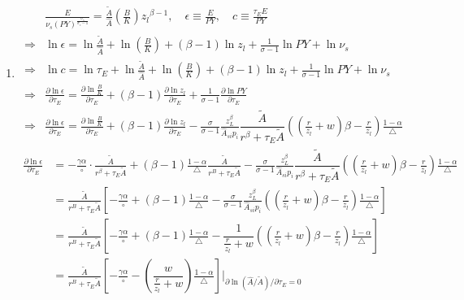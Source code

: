 \documentclass[12pt]{article} %
\begin{document}
\begin{enumerate}
 
    \item 

    \begin{align*}
        & \frac{E}{\nu_{s}(PY)^{\frac{\sigma_s}{\sigma_s - 1}}}  = \frac{\tilde{A}}{\hat{A}}(\frac{B}{K}) {{z_l}}^{\beta-1} , \quad \epsilon \equiv  \frac{E}{PY}, \quad c \equiv \frac{\tau_E E}{PY}\\
        \Rightarrow & \ln \epsilon =  \ln \frac{\tilde{A}}{\hat{A}} + \ln(\frac{B}{K}) + (\beta-1) \ln {{z_l}} + \frac{1}{\sigma -1} \ln PY + \ln \nu_{s} \\
        \Rightarrow & \ln c = \ln \tau_E + \ln \frac{\tilde{A}}{\hat{A}} + \ln(\frac{B}{K}) + (\beta-1) \ln {{z_l}} + \frac{1}{\sigma -1} \ln PY + \ln \nu_{s}
        \\
        \Rightarrow & \frac{\partial \ln \epsilon}{\partial \tau_E} =   \frac{\partial \ln \frac{B}{K} }{\partial \tau_E} 
        + (\beta - 1) \frac{\partial \ln z_l }{\partial \tau_E} + \frac{1}{\sigma -1} \frac{\partial\ln PY }{\partial \tau_E}\\
        \Rightarrow & \frac{\partial \ln \epsilon}{\partial \tau_E} =   \frac{\partial \ln \frac{B}{K} }{\partial \tau_E}
        + (\beta - 1) \frac{\partial \ln z_l }{\partial \tau_E}  - \frac{\sigma}{\sigma -1}\frac{z_L^{\beta}}{\hat{A}_{si}p_i} \dfrac{\tilde{A}}{r^\beta+\tau_E \tilde{A}}
        ((\frac{r}{z_l} + w)\beta-\frac{r}{z_l} )\frac{1-\alpha}{\triangle}
    \end{align*}
    \begin{align*}
        \frac{\partial \ln \epsilon}{\partial \tau_E}  &=   - \frac{\gamma\alpha}{\circ} \cdot \frac{\tilde{A}}{r^\beta+\tau_E \tilde{A}}	
        + (\beta-1) \frac{1-\alpha}{\triangle}\frac{\tilde{A}}{r^B + \tau_E\tilde{A}}
        - \frac{\sigma}{\sigma -1}\frac{z_L^{\beta}}{\hat{A}_{si}p_i} \dfrac{\tilde{A}}{r^\beta+\tau_E \tilde{A}}
        ((\frac{r}{z_l} + w)\beta-\frac{r}{z_l} )\frac{1-\alpha}{\triangle}\\
        &= \frac{\tilde{A}}{r^B + \tau_E\tilde{A}}\left[
            -\frac{\gamma\alpha}{\circ} 
            + (\beta-1) \frac{1-\alpha}{\triangle} 
            - \frac{\sigma}{\sigma -1}\frac{z_L^{\beta}}{{\hat{A}_{si}}p_i} {((\frac{r}{z_l} + w)\beta-\frac{r}{z_l} )}\frac{1-\alpha}{\triangle}
        \right]\\
        &= \frac{\tilde{A}}{r^B + \tau_E\tilde{A}}\left[
            -\frac{\gamma\alpha}{\circ} 
            + (\beta-1) \frac{1-\alpha}{\triangle} 
            - \dfrac{1}{\frac{r}{z_l} + w} {((\frac{r}{z_l} + w)\beta-\frac{r}{z_l} )}\frac{1-\alpha}{\triangle}
        \right]\\
        & = \frac{\tilde{A}}{r^B + \tau_E\tilde{A}}\left[
            -\frac{\gamma\alpha}{\circ} 
            - (\dfrac{w}{\frac{r}{z_l} + w})\frac{1-\alpha}{\triangle}
        \right]\left.\Bigg|_{\partial  \ln(\hat{A}/\tilde{A}) / \partial \tau_E = 0}\right.
    \end{align*}


\end{enumerate}
\end{document}
